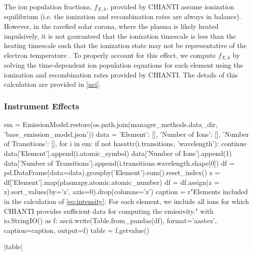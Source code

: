 The ion population fractions, $f_{X,k}$, provided by CHIANTI assume ionization equilibrium (i.e. the ionization and recombination rates are always in balance). However, in the rarefied solar corona, where the plasma is likely heated impulsively, it is not gauranteed that the ionization timescale is less than the heating timescale such that the ionization state may not be representative of the electron temperature \citep{bradshaw_explosive_2006,reale_nonequilibrium_2008,bradshaw_numerical_2009}. To properly account for this effect, we compute $f_{X,k}$ by solving the time-dependent ion population equations for each element using the ionization and recombination rates provided by CHIANTI. The details of this calculation are provided in \autoref{nei}.

\subsubsection{Instrument Effects}\label{instrument}

\begin{pycode}
em = EmissionModel.restore(os.path.join(manager_methods.data_dir, 'base_emission_model.json'))
data = {'Element': [], 'Number of Ions': [], 'Number of Transitions': [],}
for i in em:
    if not hasattr(i.transitions, 'wavelength'):
        continue
    data['Element'].append(i.atomic_symbol)
    data['Number of Ions'].append(1)
    data['Number of Transitions'].append(i.transitions.wavelength.shape[0])
df = pd.DataFrame(data=data).groupby('Element').sum().reset_index()
z = df['Element'].map(plasmapy.atomic.atomic_number)
df = df.assign(z = z).sort_values(by='z', axis=0).drop(columns='z')
caption = r"Elements included in the calculation of \autoref{eq:intensity}. For each element, we include all ions for which CHIANTI provides sufficient data for computing the emissivity.\label{tab:elements}"
with io.StringIO() as f:
    ascii.write(Table.from_pandas(df), format='aastex', caption=caption, output=f)
    table = f.getvalue()
\end{pycode}
|table|

